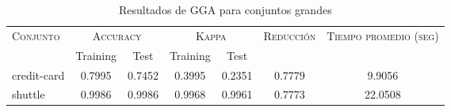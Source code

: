 \begin{table}[]
\centering
\begin{tabular}{l c c c c c c}
\hline
\multirow{2}{*}{\textsc{Conjunto}}
	& \multicolumn{2}{c}{\textsc{Accuracy}}
	& \multicolumn{2}{c}{\textsc{Kappa}}
	& \textsc{Reducción}
	& \textsc{Tiempo promedio (seg)} \\
	& Training & Test
	& Training & Test \\ 
\hline
\hline

credit-card & 0.7995 & 0.7452 & 0.3995 & 0.2351 & 0.7779 & 9.9056 \\
shuttle & 0.9986 & 0.9986 & 0.9968 & 0.9961 & 0.7773 & 22.0508 \\

\hline
\end{tabular}
\caption{Resultados de GGA para conjuntos grandes }
\label{res-grande-gga}
\end{table}

